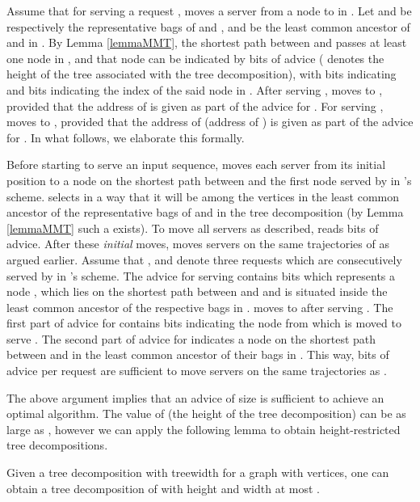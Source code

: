 Assume that for serving a request , \opt moves a server  from a node  to  in . Let  and  be respectively the representative bags of  and ,
and  be the least common ancestor of  and  in .  By Lemma \ref{lemmaMMT}, the shortest path between  and  passes at least one node  in ,  and 
that node can be indicated by  bits of advice (  denotes the height of the tree associated with the tree 
decomposition), with  bits indicating  and  bits indicating the index of the said node  in . After serving , \npc moves  to , provided that the address of  is given as part of the advice for . For serving , \npc moves  to , provided that the address of  (address of ) is given as part of the advice for . In what follows, we elaborate this formally.

Before starting to serve an input sequence, \npc moves each server  from its initial position  to a node  on the shortest path between  and the first node  served by  in \opt's scheme. \npc selects  in a way that it will be among the vertices in the least common ancestor of the representative bags of  and  in the tree decomposition (by Lemma \ref{lemmaMMT} such a  exists). To move all servers as described, \npc reads  bits of advice. After these \textit{initial} moves, \npc moves servers on the same trajectories of \opt as argued earlier. 
Assume that ,  and  denote three requests which are consecutively served by  in \opt's scheme. The advice for serving  contains  bits which represents a node ,  which lies on the shortest path between  and  and is situated inside the least common ancestor of the respective bags in . \npc moves  to  after serving . The first part of advice for  contains  bits indicating the node  from which  is moved to serve . The second part of advice for  indicates a node  on the shortest path between  and  in the least common ancestor of their bags in . This way,  bits of advice per request are sufficient to move servers on the same trajectories as \opt. 

The above argument implies that an advice of size   is sufficient to achieve an optimal algorithm. The value of  (the height of the tree decomposition) can be as large as , 
however we can apply the following lemma to obtain height-restricted tree decompositions.

\begin{lemma} \cite{Bodlaender93atourist,ICALP11} \label{lem:depthtc}
Given a tree decomposition with treewidth  for a graph  with  vertices, one can obtain a tree decomposition of  with height  and width at most .
\end{lemma}

